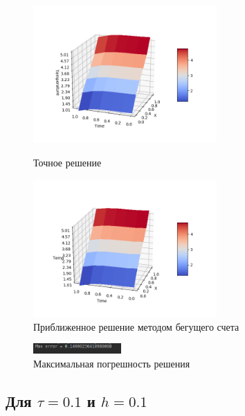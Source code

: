 \documentclass[12pt,a4paper]{scrartcl}
\begin{document}
\begin{figure}[h]
	\begin{multicols}{2}
		\hfill
		\includegraphics[width=70mm]{convect_equation/img/mainFunc5-5.png}
		\hfill
		\caption{Точное решение}
		\hfill
		\includegraphics[width=70mm]{convect_equation/img/result5-5.png}
		\hfill
		\caption{Приближенное решение методом бегущего счета}
	\end{multicols}
\end{figure}

\begin{figure}[h]
	\centering
	\includegraphics[width=0.3\textwidth]{convect_equation/img/MaxError5-5.png}
	\caption{Максимальная погрешность решения}
\end{figure}

\subsection{Для $\tau = 0.1$ и $h = 0.1$}
\end{document}
